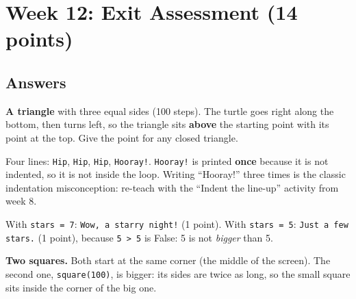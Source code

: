 \section{Week 12: Exit Assessment (14 points)}

\subsection{Answers}
\begin{answer}
\begin{description}[leftmargin=0pt,itemsep=3pt,font=\bfseries]
  \item[A1 (G9, G2).] \textbf{A triangle} with three equal sides (100 steps). The turtle goes right along the bottom,
    then turns left, so the triangle sits \textbf{above} the starting point with its point at the top.
    Give the point for any closed triangle.
  \item[A2 (G9, G2).] Four lines: \texttt{Hip}, \texttt{Hip}, \texttt{Hip}, \texttt{Hooray!}. \texttt{Hooray!} is printed
    \textbf{once} because it is not indented, so it is not inside the loop. Writing \enquote{Hooray!} three times is
    the classic indentation misconception: re-teach with the \enquote{Indent the line-up} activity from week 8.
  \item[A3 (G3, G4), 2 points.] With \texttt{stars = 7}: \texttt{Wow, a starry night!} (1 point).
    With \texttt{stars = 5}: \texttt{Just a few stars.} (1 point), because \texttt{5 > 5} is False: 5 is not
    \emph{bigger} than 5.
  \item[A4 (G5).] \textbf{Two squares.} Both start at the same corner (the middle of the screen). The second one,
    \texttt{square(100)}, is bigger: its sides are twice as long, so the small square sits inside the corner of the big one.
\end{description}
\end{answer}

